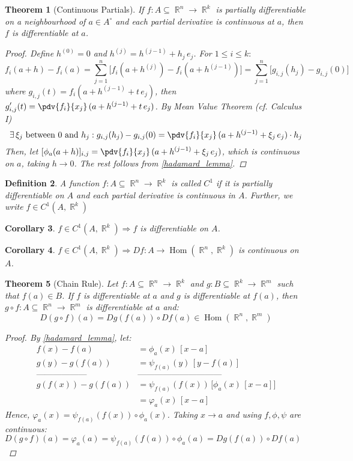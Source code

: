 \documentclass[12pt]{article}
\let\RA\Rightarrow
\newcommand{\Exist}[1]{\exists\,{#1}:}
\DeclareMathOperator{\R}{\mathbb{R}}
\DeclareMathOperator{\Hom}{Hom}
\newtheorem{theorem}{Theorem}[subsection]
\newtheorem{definition}[theorem]{Definition}
\newtheorem{corollary}[theorem]{Corollary}
\begin{document}
\begin{theorem}[Continuous Partials]
  If $f:A\subseteq \R^n\to\R^k$ is partially differentiable on a neighbourhood of $a\in A^\circ$ and each partial derivative is continuous at $a$, then $f$ is differentiable at $a$.
  \begin{proof}
    Define $h^{(0)}=0$ and $h^{(j)}=h^{(j-1)}+h_j\,e_j$. For $1\leq i\leq k:$ $$f_i(a+h)-f_i(a)=\sum_{j=1}^n\bigg[f_i(a+h^{(j)})-f_i(a+h^{(j-1)})\bigg]=\sum_{j=1}^n\bigg[g_{i,j}(h_j)-g_{i,j}(0)\bigg]$$ where $g_{i,j}(t)=f_i(a+h^{(j-1)}+t\,e_j)$, then $\displaystyle g_{i,j}'(t)=\pdv{f_i}{x_j}\,(a+h^{(j-1)}+t\,e_j)$. By Mean Value Theorem (cf. Calculus I) $$\Exist{\xi_j\text{ between }0\text{ and }h_j}g_{i,j}(h_j)-g_{i,j}(0)=\pdv{f_i}{x_j}\,(a+h^{(j-1)}+\xi_j\,e_j)\cdot h_j$$ Then, let $\displaystyle[\phi_a(a+h)]_{i,j}=\pdv{f_i}{x_j}\,(a+h^{(j-1)}+\xi_j\,e_j)$, which is continuous on $a$, taking $h\to 0$. The rest follows from \ref{hadamard_lemma}.
  \end{proof}
\end{theorem}

\begin{definition}
  A function $f:A\subseteq \R^n\to\R^k$ is called $C^1$ if it is partially differentiable on $A$ and each partial derivative is continuous in $A$. Further, we write $f\in C^1(A,\R^k)$
\end{definition}

\begin{corollary}
  $f\in C^1(A,\R^k)\RA f$ is differentiable on $A$.
\end{corollary}

\begin{corollary}
  $f\in C^1(A,\R^k)\RA Df:A\to\Hom(\R^n,\R^k)$ is continuous on $A$.
\end{corollary}

\begin{theorem}[Chain Rule]
  \label{chain_rule}
  Let $f:A\subseteq \R^n\to\R^k$ and $g:B\subseteq \R^k\to\R^m$ such that $f(a)\in B$. If $f$ is differentiable at $a$ and $g$ is differentiable at $f(a)$, then $g\circ f:A\subseteq \R^n\to\R^m$ is differentiable at $a$ and: $$D(g\circ f)(a)=Dg(f(a))\circ Df(a)\in\Hom(\R^n,\R^m)$$
  \begin{proof}
    By \ref{hadamard_lemma}, let: 
    \begin{align*}
      f(x)-f(a)&=\phi_a(x)\,[x-a]\\
      g(y)-g(f(a))&=\psi_{f(a)}(y)\,[y-f(a)]\\
      \text{------------------}&\text{------------------------------}\\
      g(f(x))-g(f(a))&=\psi_{f(a)}(f(x))\,\Big[\phi_a(x)\,[x-a]\Big]\\
      &=\varphi_a(x)\,[x-a]
    \end{align*}
    Hence, $\varphi_a(x)=\psi_{f(a)}(f(x))\circ\phi_a(x)$. Taking $x\to a$ and using $f,\phi,\psi$ are continuous: $D(g\circ f)(a)=\varphi_a(a)=\psi_{f(a)}(f(a))\circ\phi_a(a)=Dg(f(a))\circ Df(a)$
  \end{proof}
\end{theorem}
\end{document}
